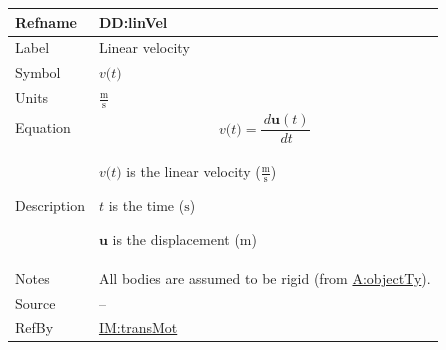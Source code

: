 \documentclass[12pt]{article}
\begin{document}
\medskip
\noindent
\begin{minipage}{\textwidth}
\begin{tabular}{>{\raggedright}p{}>{\raggedright\arraybackslash}p{}}
\toprule \textbf{Refname} & \textbf{DD:linVel}
\label{DD:linVel}
\\ \midrule
Label & Linear velocity
        
\\ \midrule
Symbol & $v\text{(}t\text{)}$
         
\\ \midrule
Units & $\frac{\text{m}}{\text{s}}$
        
\\ \midrule
Equation & \begin{displaymath}
           v\text{(}t\text{)}=\frac{\,d\symbf{u}\left(t\right)}{\,dt}
           \end{displaymath}
\\ \midrule
Description & \begin{symbDescription}
              \item{$v\text{(}t\text{)}$ is the linear velocity ($\frac{\text{m}}{\text{s}}$)}
              \item{$t$ is the time (${\text{s}}$)}
              \item{$\symbf{u}$ is the displacement (${\text{m}}$)}
              \end{symbDescription}
\\ \midrule
Notes & All bodies are assumed to be rigid (from \hyperref[assumpOT]{A:objectTy}).
        
\\ \midrule
Source & --
         
\\ \midrule
RefBy & \hyperref[IM:transMot]{IM:transMot}
        
\\ \bottomrule
\end{tabular}
\end{minipage}
\end{document}
